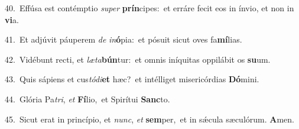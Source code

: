 {\numbfont\textcolor{\numbcolor}{40.}}~Effúsa est contémptio \textit{su}\-\textit{per} \textbf{prín}\-cipes:~\star et erráre fecit eos in ínvio, et non in \textbf{vi}\-a.\par
{\numbfont\textcolor{\numbcolor}{41.}}~Et adjúvit páuperem \textit{de} \textit{in}\-\textbf{ó}pia:~\star et pósuit sicut oves fa\-\textbf{mí}\-lias.\par
{\numbfont\textcolor{\numbcolor}{42.}}~Vidébunt recti, et \textit{læ}\-\textit{ta}\textbf{bún}tur:~\star et omnis iníquitas oppilábit os \textbf{su}\-um.\par
{\numbfont\textcolor{\numbcolor}{43.}}~Quis sápiens et cus\-\textit{tó}\-\textit{di}\textbf{et} hæc?~\star et intélliget misericórdias \textbf{Dó}\-mini.\par
{\numbfont\textcolor{\numbcolor}{44.}}~Glória Pa\-\textit{tri}\-, \textit{et} \textbf{Fí}\-lio,~\star et Spirítui \textbf{Sanc}\-to.\par
{\numbfont\textcolor{\numbcolor}{45.}}~Sicut erat in princípio, et \textit{nunc}\-, \textit{et} \textbf{sem}\-per,~\star et in sǽcula sæculórum. \textbf{A}\-men.\par
